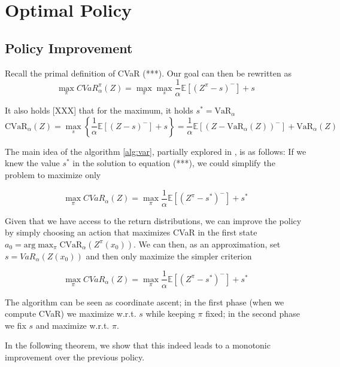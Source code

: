 \section{Optimal Policy}\label{sec:qpolicy}
\subsection{Policy Improvement}
Recall the primal definition of CVaR (***).
Our goal can then be rewritten as
\begin{equation}\label{eq:goal}
\max_\pi CVaR_\alpha^\pi(Z) = \max_\pi \max_s \dfrac{1}{\alpha}\mathbb{E}
\left[ (Z^\pi-s)^-\right] + s
\end{equation}


It also holds [XXX] that for the maximum, it holds $s^*=\text{VaR}_\alpha$
\begin{equation}
\text{CVaR}_\alpha(Z)=
\max_s\left\lbrace \dfrac{1}{\alpha}\mathbb{E}
\left[ (Z-s)^-\right] + s  \right\rbrace =\dfrac{1}{\alpha}\mathbb{E}
\left[ (Z - \text{VaR}_\alpha(Z))^-\right] + \text{VaR}_\alpha(Z) 
\end{equation}


The main idea of the algorithm \ref{alg:var}, partially explored in \cite{bauerle2011markov}, is as follows: If we knew the value $s^*$ in the solution to equation (***), we could simplify the problem to maximize only

\begin{equation}\label{eq:goal}
\max_\pi CVaR_\alpha(Z) = \max_\pi \dfrac{1}{\alpha}\mathbb{E}
\left[ (Z^\pi-s^*)^-\right] + s^*
\end{equation}

Given that we have access to the return distributions, we can improve the policy by simply choosing an action that maximizes CVaR in the first state $a_0 = \text{arg}\max_\pi\text{CVaR}_\alpha(Z^\pi(x_0))$. We can then, as an approximation, set $s= VaR_\alpha(Z(x_0))$ and then only maximize the simpler criterion


\begin{equation}
\max_\pi CVaR_\alpha(Z) = \max_\pi \dfrac{1}{\alpha}\mathbb{E}
\left[ (Z^\pi-s^*)^-\right] + s^*
\end{equation}


The algorithm can be seen as coordinate ascent; in the first phase (when we compute CVaR) we maximize w.r.t. $s$ while keeping $\pi$ fixed; in the second phase we fix $s$ and maximize w.r.t. $\pi$.

In the following theorem, we show that this indeed leads to a monotonic improvement over the previous policy.

